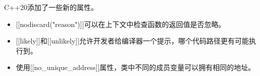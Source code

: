\begin{tcolorbox}[breakable,enhanced jigsaw,colback=mygreen!5!white,colframe=mygreen!75!black,title={总结}]
C++20添加了一些新的属性。
\begin{itemize}
\item 
{}[[nodiscard("reason")]]可以在上下文中检查函数的返回值是否忽略。

\item 
{}[[likely]]和[[unlikely]]允许开发者给编译器一个提示，哪个代码路径更有可能执行到。

\item 
使用[[no\_unique\_address]]属性，类中不同的成员变量可以拥有相同的地址。
\end{itemize}
\end{tcolorbox}

\newpage
















